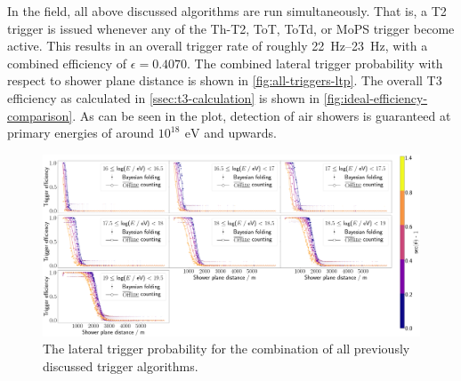 In the field, all above discussed algorithms are run simultaneously. That is, a T2 trigger is issued whenever any of the Th-T2, ToT, ToTd, or MoPS trigger become 
active. This results in an overall trigger rate of roughly \SIrange[range-phrase = \,\text{to}\,]{22}{23}{\hertz}, with a combined efficiency of 
$\epsilon = 0.4070$. The combined lateral trigger probability with respect to shower plane distance is shown in \autoref{fig:all-triggers-ltp}. The overall T3 
efficiency as calculated in \autoref{ssec:t3-calculation} is shown in \autoref{fig:ideal-efficiency-comparison}. As can be seen in the plot, detection of air 
showers is guaranteed at primary energies of around $10^{18}\,\SI{}{\electronvolt}$ and upwards.

\begin{figure}
	\centering
	\includegraphics[width=\textwidth]{./plots/all_LTP_comparison.png}
	\caption{The lateral trigger probability for the combination of all previously discussed trigger algorithms.} 
	\label{fig:all-triggers-ltp}
\end{figure}
